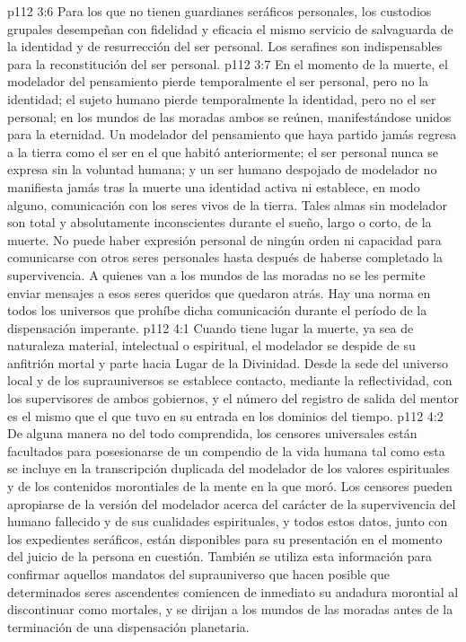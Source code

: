 \vs p112 3:6 Para los que no tienen guardianes seráficos personales, los custodios grupales desempeñan con fidelidad y eficacia el mismo servicio de salvaguarda de la identidad y de resurrección del ser personal. Los serafines son indispensables para la reconstitución del ser personal.
\vs p112 3:7 En el momento de la muerte, el modelador del pensamiento pierde temporalmente el ser personal, pero no la identidad; el sujeto humano pierde temporalmente la identidad, pero no el ser personal; en los mundos de las moradas ambos se reúnen, manifestándose unidos para la eternidad. Un modelador del pensamiento que haya partido jamás regresa a la tierra como el ser en el que habitó anteriormente; el ser personal nunca se expresa sin la voluntad humana; y un ser humano despojado de modelador no manifiesta jamás tras la muerte una identidad activa ni establece, en modo alguno, comunicación con los seres vivos de la tierra. Tales almas sin modelador son total y absolutamente inconscientes durante el sueño, largo o corto, de la muerte. No puede haber expresión personal de ningún orden ni capacidad para comunicarse con otros seres personales hasta después de haberse completado la supervivencia. A quienes van a los mundos de las moradas no se les permite enviar mensajes a esos seres queridos que quedaron atrás. Hay una norma en todos los universos que prohíbe dicha comunicación durante el período de la dispensación imperante.
\vs p112 4:1 Cuando tiene lugar la muerte, ya sea de naturaleza material, intelectual o espiritual, el modelador se despide de su anfitrión mortal y parte hacia Lugar de la Divinidad. Desde la sede del universo local y de los suprauniversos se establece contacto, mediante la reflectividad, con los supervisores de ambos gobiernos, y el número del registro de salida del mentor es el mismo que el que tuvo en su entrada en los dominios del tiempo.
\vs p112 4:2 De alguna manera no del todo comprendida, los censores universales están facultados para posesionarse de un compendio de la vida humana tal como esta se incluye en la transcripción duplicada del modelador de los valores espirituales y de los contenidos morontiales de la mente en la que moró. Los censores pueden apropiarse de la versión del modelador acerca del carácter de la supervivencia del humano fallecido y de sus cualidades espirituales, y todos estos datos, junto con los expedientes seráficos, están disponibles para su presentación en el momento del juicio de la persona en cuestión. También se utiliza esta información para confirmar aquellos mandatos del suprauniverso que hacen posible que determinados seres ascendentes comiencen de inmediato su andadura morontial al discontinuar como mortales, y se dirijan a los mundos de las moradas antes de la terminación de una dispensación planetaria.
